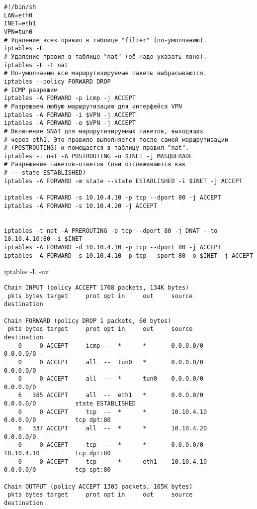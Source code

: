 \documentclass[a4paper,12pt]{article}
\begin{document}
\begin{Verbatim}
#!/bin/sh
LAN=eth0
INET=eth1
VPN=tun0
# Удаление всех правил в таблице "filter" (по-умолчанию).
iptables -F
# Удаление правил в таблице "nat" (её надо указать явно).
iptables -F -t nat
# По-умолчанию все маршрутизируемые пакеты выбрасываются.
iptables --policy FORWARD DROP
# ICMP разрешим
iptables -A FORWARD -p icmp -j ACCEPT
# Разрешаем любую маршрутизацию для интерфейса VPN
iptables -A FORWARD -i $VPN -j ACCEPT
iptables -A FORWARD -o $VPN -j ACCEPT
# Включение SNAT для маршрутизируемых пакетов, выходящих
# через eth1. Это правило выполняется после самой маршрутизации
# (POSTROUTING) и помещается в таблицу правил "nat".
iptables -t nat -A POSTROUTING -o $INET -j MASQUERADE
# Разрешение пакетов-ответов (они отслеживаются как
# -- state ESTABLISHED)
iptables -A FORWARD -m state --state ESTABLISHED -i $INET -j ACCEPT

iptables -A FORWARD -s 10.10.4.10 -p tcp --dport 80 -j ACCEPT
iptables -A FORWARD -s 10.10.4.20 -j ACCEPT


iptables -t nat -A PREROUTING -p tcp --dport 80 -j DNAT --to 10.10.4.10:80 -i $INET
iptables -A FORWARD -d 10.10.4.10 -p tcp --dport 80 -j ACCEPT
iptables -A FORWARD -s 10.10.4.10 -p tcp --sport 80 -o $INET -j ACCEPT
\end{Verbatim}

iptables -L -nv
\begin{Verbatim}
Chain INPUT (policy ACCEPT 1708 packets, 134K bytes)
 pkts bytes target     prot opt in     out     source               destination         

Chain FORWARD (policy DROP 1 packets, 60 bytes)
 pkts bytes target     prot opt in     out     source               destination         
    0     0 ACCEPT     icmp --  *      *       0.0.0.0/0            0.0.0.0/0           
    0     0 ACCEPT     all  --  tun0   *       0.0.0.0/0            0.0.0.0/0           
    0     0 ACCEPT     all  --  *      tun0    0.0.0.0/0            0.0.0.0/0           
    6   385 ACCEPT     all  --  eth1   *       0.0.0.0/0            0.0.0.0/0           state ESTABLISHED 
    0     0 ACCEPT     tcp  --  *      *       10.10.4.10           0.0.0.0/0           tcp dpt:80 
    6   337 ACCEPT     all  --  *      *       10.10.4.20           0.0.0.0/0           
    0     0 ACCEPT     tcp  --  *      *       0.0.0.0/0            10.10.4.10          tcp dpt:80 
    0     0 ACCEPT     tcp  --  *      eth1    10.10.4.10           0.0.0.0/0           tcp spt:80 

Chain OUTPUT (policy ACCEPT 1303 packets, 105K bytes)
 pkts bytes target     prot opt in     out     source               destination
\end{Verbatim}
\end{document}
